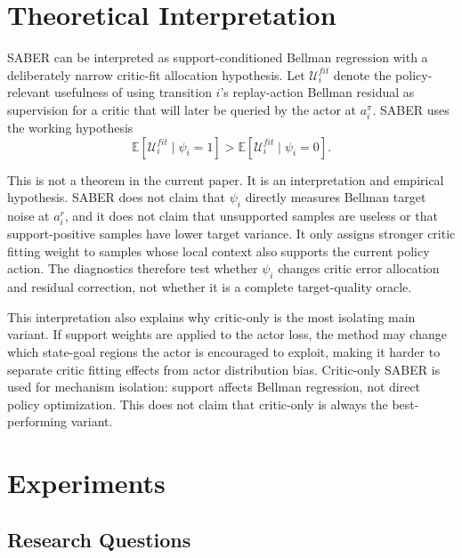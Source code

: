\documentclass[letterpaper]{article}
\begin{document}
\section{Theoretical Interpretation}

SABER can be interpreted as support-conditioned Bellman regression with a deliberately narrow critic-fit allocation hypothesis. Let \(\mathcal U_i^{fit}\) denote the policy-relevant usefulness of using transition \(i\)'s replay-action Bellman residual as supervision for a critic that will later be queried by the actor at \(a_i^\pi\). SABER uses the working hypothesis
\begin{equation}
\mathbb E[\mathcal U_i^{fit}\mid \psi_i=1]
>
\mathbb E[\mathcal U_i^{fit}\mid \psi_i=0].
\end{equation}

This is not a theorem in the current paper. It is an interpretation and empirical hypothesis. SABER does not claim that \(\psi_i\) directly measures Bellman target noise at \(a_i^r\), and it does not claim that unsupported samples are useless or that support-positive samples have lower target variance. It only assigns stronger critic fitting weight to samples whose local context also supports the current policy action. The diagnostics therefore test whether \(\psi_i\) changes critic error allocation and residual correction, not whether it is a complete target-quality oracle.

This interpretation also explains why critic-only is the most isolating main variant. If support weights are applied to the actor loss, the method may change which state-goal regions the actor is encouraged to exploit, making it harder to separate critic fitting effects from actor distribution bias. Critic-only SABER is used for mechanism isolation: support affects Bellman regression, not direct policy optimization. This does not claim that critic-only is always the best-performing variant.

\section{Experiments}

\subsection{Research Questions}
\end{document}
